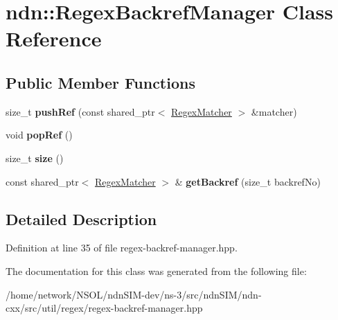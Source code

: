 \hypertarget{classndn_1_1RegexBackrefManager}{}\section{ndn\+:\+:Regex\+Backref\+Manager Class Reference}
\label{classndn_1_1RegexBackrefManager}
\subsection*{Public Member Functions}
\begin{DoxyCompactItemize}
\item 
size\+\_\+t {\bfseries push\+Ref} (const shared\+\_\+ptr$<$ \hyperlink{classndn_1_1RegexMatcher}{Regex\+Matcher} $>$ \&matcher)\hypertarget{classndn_1_1RegexBackrefManager_afed9718668ef989828d5a4db42409336}{}\label{classndn_1_1RegexBackrefManager_afed9718668ef989828d5a4db42409336}

\item 
void {\bfseries pop\+Ref} ()\hypertarget{classndn_1_1RegexBackrefManager_ac8d37f94588217c0f822c2a834eea3ce}{}\label{classndn_1_1RegexBackrefManager_ac8d37f94588217c0f822c2a834eea3ce}

\item 
size\+\_\+t {\bfseries size} ()\hypertarget{classndn_1_1RegexBackrefManager_a02a846a31d7e1d10b2415d11a74db437}{}\label{classndn_1_1RegexBackrefManager_a02a846a31d7e1d10b2415d11a74db437}

\item 
const shared\+\_\+ptr$<$ \hyperlink{classndn_1_1RegexMatcher}{Regex\+Matcher} $>$ \& {\bfseries get\+Backref} (size\+\_\+t backref\+No)\hypertarget{classndn_1_1RegexBackrefManager_acb8633cf83002bdf6387a33193d99381}{}\label{classndn_1_1RegexBackrefManager_acb8633cf83002bdf6387a33193d99381}

\end{DoxyCompactItemize}


\subsection{Detailed Description}


Definition at line 35 of file regex-\/backref-\/manager.\+hpp.



The documentation for this class was generated from the following file\+:\begin{DoxyCompactItemize}
\item 
/home/network/\+N\+S\+O\+L/ndn\+S\+I\+M-\/dev/ns-\/3/src/ndn\+S\+I\+M/ndn-\/cxx/src/util/regex/regex-\/backref-\/manager.\+hpp\end{DoxyCompactItemize}
